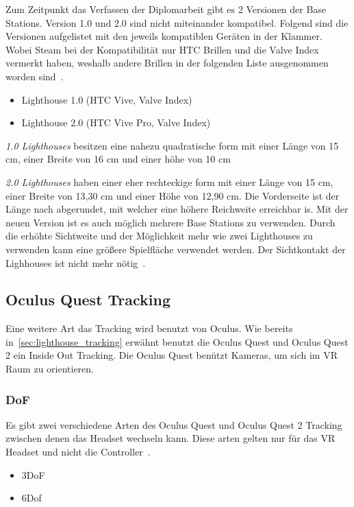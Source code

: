 Zum Zeitpunkt das Verfassen der Diplomarbeit gibt es 2 Versionen der Base Stations.
Version 1.0 und 2.0 sind nicht miteinander kompatibel.
Folgend sind die Versionen aufgelistet mit den jeweils kompatiblen Geräten in der Klammer.
Wobei Steam bei der Kompatibilität nur HTC Brillen und die Valve Index vermerkt haben, weshalb andere Brillen in der folgenden Liste ausgenommen worden sind~\cite{steam_lighhouse_versions}.

\begin{itemize}
    \item Lighthouse 1.0 (HTC Vive, Valve Index)
    \item Lighthouse 2.0 (HTC Vive Pro, Valve Index)
\end{itemize}

\emph{1.0 Lighthouses} besitzen eine nahezu quadratische form mit einer Länge von 15 cm, einer Breite von 16 cm und einer höhe von 10 cm

\emph{2.0 Lighthouses} haben einer eher rechteckige form mit einer Länge von 15 cm, einer Breite von 13,30 cm und einer Höhe von 12,90 cm.
Die Vorderseite ist der Länge nach abgerundet, mit welcher eine höhere Reichweite erreichbar is.
Mit der neuen Version ist es auch möglich mehrere Base Stations zu verwenden.
Durch die erhöhte Sichtweite und der Möglichkeit mehr wie zwei Lighthouses zu verwenden kann eine größere Spielfläche verwendet werden.
Der Sichtkontakt der Lighhouses ist nicht mehr nötig~\cite{Cale_2019}.

\subsection{Oculus Quest Tracking}
\label{sec:oculus_quest_tracking}

Eine weitere Art das Tracking wird benutzt von Oculus.
Wie bereits in~\ref{sec:lighthouse_tracking} erwähnt benutzt die Oculus Quest und Oculus Quest 2 ein Inside Out Tracking.
Die Oculus Quest benützt Kameras, um sich im VR Raum zu orientieren.

\subsubsection{DoF}

Es gibt zwei verschiedene Arten des Oculus Quest und Oculus Quest 2 Tracking zwischen denen das Headset wechseln kann.
Diese arten gelten nur für das VR Headset und nicht die Controller~\cite{oculus_support_headset_tracking}.

\begin{itemize}
    \item 3DoF
    \item 6Dof
\end{itemize}

